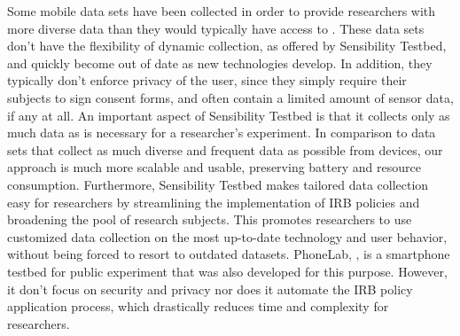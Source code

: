 

Some mobile data sets have been collected in order to provide researchers with more diverse data than they would typically have access to \cite{kiukkonen2010towards, wagner2014device}.  These data sets don't have the flexibility of dynamic collection, as offered by Sensibility Testbed, and quickly become out of date as new technologies develop. In addition, they typically don't enforce privacy of the user, since they simply require their subjects to sign consent forms, and often contain a limited amount of sensor data, if any at all. An important aspect of Sensibility Testbed is that it collects only as much data as is necessary for a researcher's experiment. In comparison to data sets that collect as much diverse and frequent data as possible from devices, our approach is much more scalable and usable, preserving battery and resource consumption. Furthermore, Sensibility Testbed makes tailored data collection easy for researchers by streamlining the implementation of IRB policies and broadening the pool of research subjects. This promotes researchers to use customized data collection on the most up-to-date technology and user behavior, without being forced to resort to outdated datasets. PhoneLab, \cite{nandugudi2013phonelab}, is a smartphone testbed for public experiment that was also developed for this purpose. However, it don't focus on security and privacy nor does it automate the IRB policy application process, which drastically reduces time and complexity for researchers.